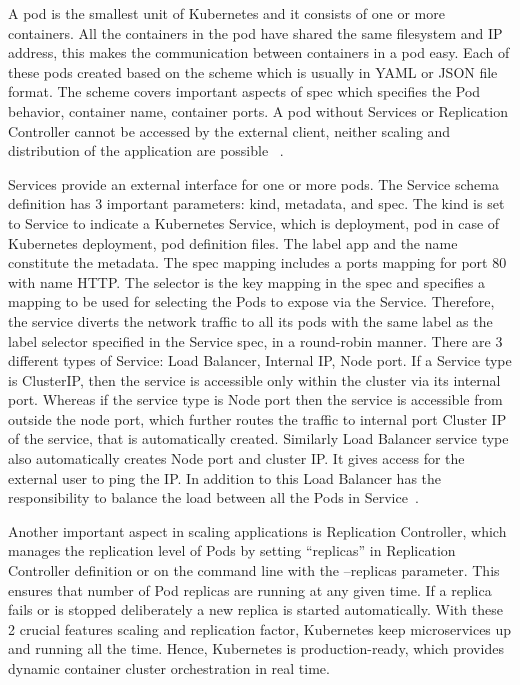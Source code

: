 A pod is the smallest unit of Kubernetes and it consists of one or
more containers. All the containers in the pod have shared the same
filesystem and IP address, this makes the communication between
containers in a pod easy. Each of these pods created based on the
scheme which is usually in YAML or JSON file format. The scheme covers
important aspects of spec which specifies the Pod behavior, container
name, container ports. A pod without Services or Replication
Controller cannot be accessed by the external client, neither scaling
and distribution of the application are possible
~\cite{hid-sp18-602-pods}.

Services provide an external interface for one or more pods. The
Service schema definition has 3 important parameters: kind, metadata,
and spec. The kind is set to Service to indicate a Kubernetes Service,
which is deployment, pod in case of Kubernetes deployment, pod
definition files. The label app and the name constitute the
metadata. The spec mapping includes a ports mapping for port 80 with
name HTTP. The selector is the key mapping in the spec and specifies a
mapping to be used for selecting the Pods to expose via the
Service. Therefore, the service diverts the network traffic to all its
pods with the same label as the label selector specified in the
Service spec, in a round-robin manner. There are 3 different types of
Service: Load Balancer, Internal IP, Node port. If a Service type is
ClusterIP, then the service is accessible only within the cluster via
its internal port. Whereas if the service type is Node port then the
service is accessible from outside the node port, which further routes
the traffic to internal port Cluster IP of the service, that is
automatically created. Similarly Load Balancer service type also
automatically creates Node port and cluster IP. It gives access for
the external user to ping the IP. In addition to this Load Balancer
has the responsibility to balance the load between all the Pods in
Service~\cite{hid-sp18-602-services}.

Another important aspect in scaling applications is Replication
Controller, which manages the replication level of Pods by setting
“replicas” in Replication Controller definition or on the command line
with the –replicas parameter. This ensures that number of Pod replicas
are running at any given time. If a replica fails or is stopped
deliberately a new replica is started automatically. With these 2
crucial features scaling and replication factor, Kubernetes keep
microservices up and running all the time. Hence, Kubernetes is
production-ready, which provides dynamic container cluster
orchestration in real time.

